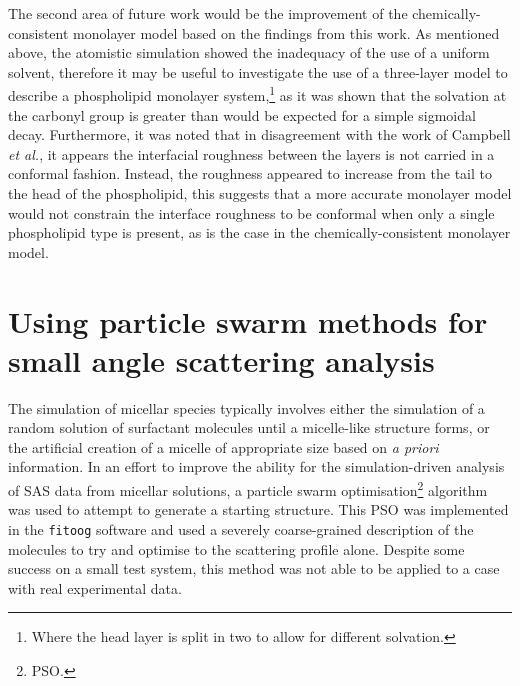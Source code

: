 The second area of future work would be the improvement of the chemically-consistent monolayer model based on the findings from this work.
As mentioned above, the atomistic simulation showed the inadequacy of the use of a uniform solvent, therefore it may be useful to investigate the use of a three-layer model to describe a phospholipid monolayer system,\footnote{Where the head layer is split in two to allow for different solvation.} as it was shown that the solvation at the carbonyl group is greater than would be expected for a simple sigmoidal decay.
Furthermore, it was noted that in disagreement with the work of Campbell \emph{et al.},\autocite{campbell_structure_2018} it appears the interfacial roughness between the layers is not carried in a conformal fashion.
Instead, the roughness appeared to increase from the tail to the head of the phospholipid, this suggests that a more accurate monolayer model would not constrain the interface roughness to be conformal when only a single phospholipid type is present, as is the case in the chemically-consistent monolayer model.

\section{Using particle swarm methods for small angle scattering analysis}
The simulation of micellar species typically involves either the simulation of a random solution of surfactant molecules until a micelle-like structure forms, or the artificial creation of a micelle of appropriate size based on \emph{a priori} information.
In an effort to improve the ability for the simulation-driven analysis of SAS data from micellar solutions, a particle swarm optimisation\footnote{PSO.} algorithm was used to attempt to generate a starting structure.
This PSO was implemented in the \texttt{fitoog} software and used a severely coarse-grained description of the molecules to try and optimise to the scattering profile alone.
Despite some success on a small test system, this method was not able to be applied to a case with real experimental data.

